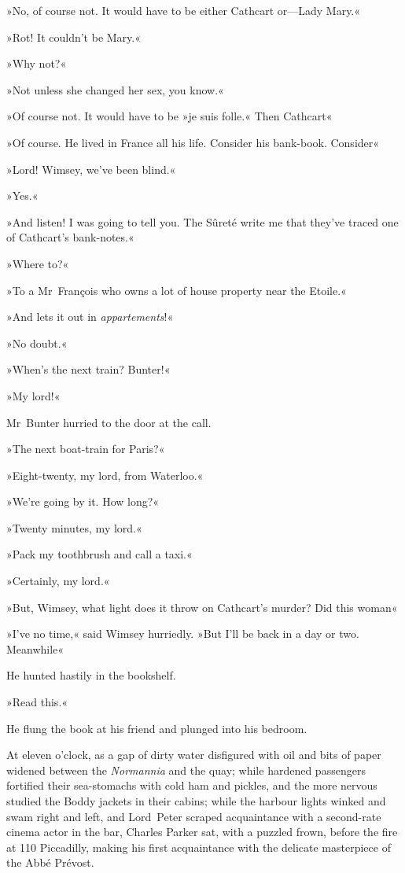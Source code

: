 »No, of course not. It would have to be either Cathcart or—Lady Mary.«

»Rot! It couldn't be Mary.«

»Why not?«

»Not unless she changed her sex, you know.«

»Of course not. It would have to be »je suis folle.« Then Cathcart\longdash«

»Of course. He lived in France all his life. Consider his bank-book. Consider\longdash«

»Lord! Wimsey, we've been blind.«

»Yes.«

»And listen! I was going to tell you. The Sûreté write me that they've traced one of Cathcart's bank-notes.«

»Where to?«

»To a Mr~François who owns a lot of house property near the Etoile.«

»And lets it out in \textit{appartements}!«

»No doubt.«

»When's the next train? Bunter!«

»My lord!«

Mr~Bunter hurried to the door at the call.

»The next boat-train for Paris?«

»Eight-twenty, my lord, from Waterloo.«

»We're going by it. How long?«

»Twenty minutes, my lord.«

»Pack my toothbrush and call a taxi.«

»Certainly, my lord.«

»But, Wimsey, what light does it throw on Cathcart's murder? Did this woman\longdash«

»I've no time,« said Wimsey hurriedly. »But I'll be back in a day or two. Meanwhile\longdash«

He hunted hastily in the bookshelf.

»Read this.«

He flung the book at his friend and plunged into his bedroom.

At eleven o'clock, as a gap of dirty water disfigured with oil and bits of paper widened between the \textit{Normannia} and the quay; while hardened passengers fortified their sea-stomachs with cold ham and pickles, and the more nervous studied the Boddy jackets in their cabins; while the harbour lights winked and swam right and left, and Lord~Peter scraped acquaintance with a second-rate cinema actor in the bar, Charles Parker sat, with a puzzled frown, before the fire at 110 Piccadilly, making his first acquaintance with the delicate masterpiece of the Abbé Prévost.

